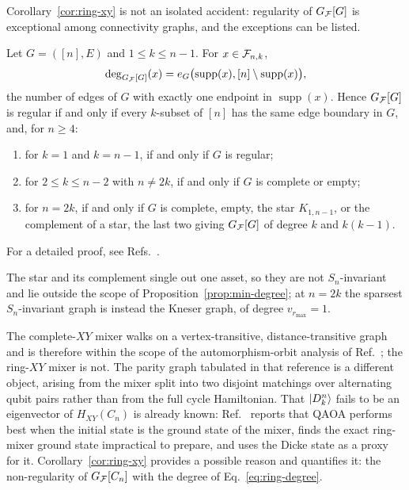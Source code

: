 Corollary~\ref{cor:ring-xy} is not an isolated accident: regularity of
$G_{\mathcal{F}}[G]$ is exceptional among connectivity graphs, and the exceptions can
be listed.

\begin{proposition}
\label{prop:xy-regularity}
Let $G=([n],E)$ and $1\le k\le n-1$. For $x\in\mathcal{F}_{n,k}$,
\begin{equation}
    \deg_{G_{\mathcal{F}}[G]}(x)
    =
    e_G\bigl(\operatorname{supp}(x),[n]\setminus\operatorname{supp}(x)\bigr),
    \label{eq:boundary-degree}
\end{equation}
the number of edges of $G$ with exactly one endpoint in
$\operatorname{supp}(x)$. Hence $G_{\mathcal{F}}[G]$ is regular if and only if every
$k$-subset of $[n]$ has the same edge boundary in $G$, and, for $n\ge4$:
\begin{enumerate}
\item[(i)] for $k=1$ and $k=n-1$, if and only if $G$ is regular;
\item[(ii)] for $2\le k\le n-2$ with $n\neq2k$, if and only if $G$ is
      complete or empty;
\item[(iii)] for $n=2k$, if and only if $G$ is complete, empty, the star
      $K_{1,n-1}$, or the complement of a star, the last two giving
      $G_{\mathcal{F}}[G]$ of degree $k$ and $k(k-1)$.
\end{enumerate}
\end{proposition}

For a detailed proof, see Refs.~\cite{FabilaMonroy2012Token,Carballosa2017Regularity}.

\begin{remark}
The star and its complement single out one asset, so they are not
$S_n$-invariant and lie outside the scope of
Proposition~\ref{prop:min-degree}; at $n=2k$ the sparsest $S_n$-invariant
graph is instead the Kneser graph, of degree $v_{r_{\max}}=1$.
\end{remark}

The complete-$XY$ mixer walks on a vertex-transitive, distance-transitive
graph and is therefore within the scope of the automorphism-orbit analysis of
Ref.~\cite{Matwiejew2024}; the ring-$XY$ mixer is not. The parity graph
tabulated in that reference is a different object, arising from the mixer
split into two disjoint matchings over alternating qubit pairs rather than
from the full cycle Hamiltonian. That $\ket{D^n_k}$ fails to be an eigenvector
of $H_{XY}(C_n)$ is already known: Ref.~\cite{He2023} reports that QAOA
performs best when the initial state is the ground state of the mixer, finds
the exact ring-mixer ground state impractical to prepare, and uses the Dicke
state as a proxy for it. Corollary~\ref{cor:ring-xy} provides a possible reason and
quantifies it: the non-regularity of $G_{\mathcal{F}}[C_n]$ with
the degree of Eq.~\eqref{eq:ring-degree}.

